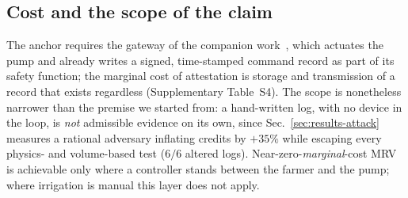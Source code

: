 \subsection{Cost and the scope of the claim}

The anchor requires the gateway of the companion work~\cite{twingate2026},
which actuates the pump and already writes a signed, time-stamped command
record as part of its safety function; the marginal cost of attestation is
storage and transmission of a record that exists regardless (Supplementary Table~S4). The scope is
nonetheless narrower than the premise we started from: a hand-written log, with
no device in the loop, is \emph{not} admissible evidence on its own, since
Sec.~\ref{sec:results-attack} measures a rational adversary inflating credits by
$+35\%$ while escaping every physics- and volume-based test ($6/6$ altered
logs). Near-zero-\emph{marginal}-cost MRV is achievable only where a controller stands
between
the farmer and the pump; where irrigation is manual this layer does not
apply.
